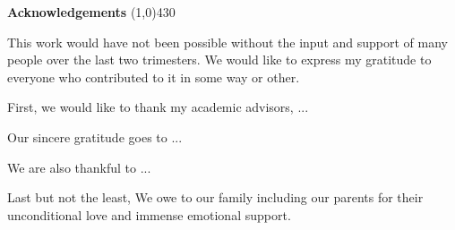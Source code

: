 \begin{center}
{\huge \bf Acknowledgements}
\line(1,0){430}
\end{center}



This work would have not been possible without the input and support of many people over the last two trimesters. We would like to express my gratitude to everyone who contributed to it in some way or other.

First, we would like to thank my academic advisors, ...


Our sincere gratitude goes to ...

We are also thankful to ...

Last but not the least, We owe to our family including our parents for their unconditional love and immense emotional support. 

